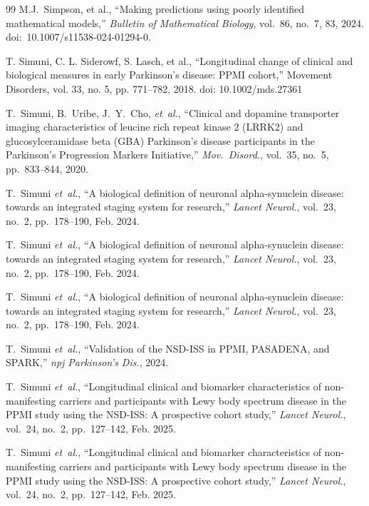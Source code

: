 \begin{thebibliography}{99}
M.J.~Simpson, et al., ``Making predictions using poorly identified mathematical models,'' \textit{Bulletin of Mathematical Biology}, vol.~86, no.~7, 83, 2024. doi:~10.1007/s11538-024-01294-0.

 T. Simuni, C. L. Siderowf, S. Lasch, et al., ``Longitudinal change of clinical and biological measures in early Parkinson's disease: PPMI cohort,'' Movement Disorders, vol. 33, no. 5, pp. 771--782, 2018. doi: 10.1002/mds.27361

T.~Simuni, B.~Uribe, J.~Y.~Cho, \textit{et~al.}, ``Clinical and dopamine transporter imaging characteristics of leucine rich repeat kinase 2 (LRRK2) and glucosylceramidase beta (GBA) Parkinson's disease participants in the Parkinson's Progression Markers Initiative,'' \textit{Mov.\ Disord.}, vol.~35, no.~5, pp.~833--844, 2020.

T.~Simuni \textit{et~al.}, ``A biological definition of neuronal alpha-synuclein disease: towards an integrated staging system for research,'' \textit{Lancet Neurol.}, vol.~23, no.~2, pp.~178--190, Feb. 2024.

T.~Simuni \textit{et~al.}, ``A biological definition of neuronal alpha-synuclein disease: towards an integrated staging system for research,'' \textit{Lancet Neurol.}, vol.~23, no.~2, pp.~178--190, Feb. 2024.

T.~Simuni \textit{et~al.}, ``A biological definition of neuronal alpha-synuclein disease: towards an integrated staging system for research,'' \textit{Lancet Neurol.}, vol.~23, no.~2, pp.~178--190, Feb. 2024.

T.~Simuni \textit{et~al.}, ``Validation of the NSD-ISS in PPMI, PASADENA, and SPARK,'' \textit{npj Parkinson's Dis.}, 2024.

T.~Simuni \textit{et~al.}, ``Longitudinal clinical and biomarker characteristics of non-manifesting carriers and participants with Lewy body spectrum disease in the PPMI study using the NSD-ISS: A prospective cohort study,'' \textit{Lancet Neurol.}, vol.~24, no.~2, pp.~127--142, Feb. 2025.

T.~Simuni \textit{et~al.}, ``Longitudinal clinical and biomarker characteristics of non-manifesting carriers and participants with Lewy body spectrum disease in the PPMI study using the NSD-ISS: A prospective cohort study,'' \textit{Lancet Neurol.}, vol.~24, no.~2, pp.~127--142, Feb. 2025.


\end{thebibliography}
